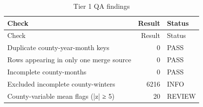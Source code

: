 \documentclass[11pt, english, letterpaper]{article}
\begin{document}
\begin{longtable}{@{}lrl@{}}
\caption{Tier 1 QA findings}\\
\toprule Check & Result & Status \\ \midrule \endfirsthead
\toprule Check & Result & Status \\ \midrule \endhead
\bottomrule \endfoot
Duplicate county-year-month keys & 0 & PASS \\
Rows appearing in only one merge source & 0 & PASS \\
Incomplete county-months & 0 & PASS \\
Excluded incomplete county-winters & 6216 & INFO \\
County-variable mean flags (|z| ≥ 5) & 20 & REVIEW \\
\end{longtable}
\clearpage
\end{document}
